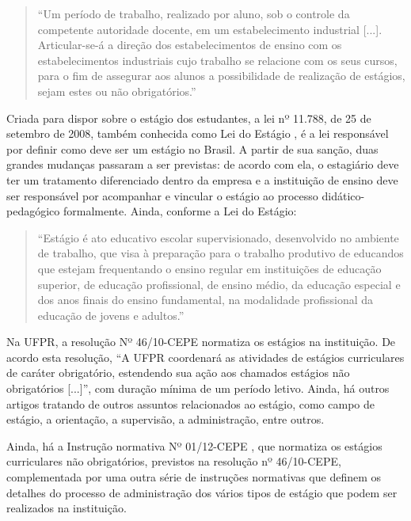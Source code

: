 \documentclass[conference,a4paper,10pt]{IEEETran}
\begin{document}
\begin{quote}
``Um período de trabalho, realizado por aluno, sob o controle da competente autoridade docente, em um estabelecimento industrial [...]. Articular-se-á a direção dos estabelecimentos de ensino com os estabelecimentos industriais cujo trabalho se relacione com os seus cursos, para o fim de assegurar aos alunos a possibilidade de realização de estágios, sejam estes ou não obrigatórios.'' \cite[art.48]{brasil1942}
\end{quote}

Criada para dispor sobre o estágio dos estudantes, a lei nº 11.788, de 25 de setembro de 2008, também conhecida como Lei do Estágio \cite{brasil2008}, é a lei responsável por definir como deve ser um estágio no Brasil. A partir de sua sanção, duas grandes
mudanças passaram a ser previstas: de acordo com ela, o estagiário deve ter um tratamento diferenciado dentro da empresa e a instituição de ensino deve ser responsável por acompanhar e vincular o estágio ao processo didático-pedagógico formalmente. Ainda, conforme a Lei do Estágio:

\begin{quote}
``Estágio é ato educativo escolar supervisionado, desenvolvido no ambiente de trabalho, que visa à preparação para o trabalho produtivo de educandos que estejam frequentando o ensino regular em instituições de educação superior, de educação profissional, de ensino médio, da educação especial e dos anos finais do ensino fundamental, na modalidade profissional da educação de jovens e adultos.'' \cite[art.1o]{brasil2008}
\end{quote}

Na UFPR, a resolução Nº 46/10-CEPE \cite{ufpr_est_res} normatiza os estágios na instituição. De acordo esta resolução, ``A UFPR coordenará as atividades de estágios curriculares de caráter obrigatório, estendendo sua ação aos chamados estágios não obrigatórios [...]'', com duração mínima de um período letivo. Ainda, há outros artigos tratando de outros assuntos relacionados ao estágio, como campo de estágio, a orientação, a supervisão, a administração, entre outros.

Ainda, há a Instrução normativa Nº 01/12-CEPE \cite{ufpr_est_in}, que normatiza os estágios curriculares não obrigatórios, previstos na resolução nº 46/10-CEPE, complementada por uma outra série de instruções normativas que definem os detalhes do processo de administração dos vários tipos de estágio que podem ser realizados na instituição.
\end{document}
